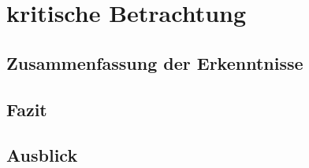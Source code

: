 \chapter{kritische Betrachtung}
\section{Zusammenfassung der Erkenntnisse}
\section{Fazit}
\section{Ausblick}
